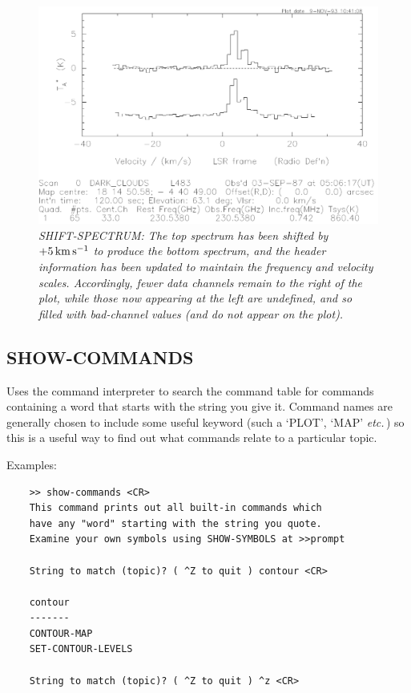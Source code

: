 \documentclass[11pt,twoside]{report}
\newcommand{\etc}{{\it etc.\,}}
\newcommand{\kms}{{\rm\,km\,s^{-1}}}
\begin{document}
\begin{figure}[htbp]
\begin{center}
\includegraphics[scale=0.65]{shift}
\protect\parbox{5.5in}
{\caption[SHIFT]
{\sl
SHIFT-SPECTRUM: The top spectrum has been shifted by $+5\kms$ to produce
the bottom spectrum, and the header information has been updated to maintain
the frequency and velocity scales. Accordingly, fewer data channels remain to
the right of the plot, while those now appearing at the left are undefined, and
so filled with bad-channel values (and do not appear on the plot).
\label{SHIFT}
}
}
\end{center}
\end{figure}

\subsection{SHOW-COMMANDS} 

Uses the command interpreter to search the command table 
for commands containing a word that starts with the string you give it. Command
names are generally chosen to include some useful keyword  (such
a `PLOT', `MAP' \etc) so this is a useful way to find out what commands relate
to a particular topic.

Examples:
\begin{verbatim}
    >> show-commands <CR>
    This command prints out all built-in commands which
    have any "word" starting with the string you quote.
    Examine your own symbols using SHOW-SYMBOLS at >>prompt

    String to match (topic)? ( ^Z to quit ) contour <CR>

    contour
    -------
    CONTOUR-MAP
    SET-CONTOUR-LEVELS

    String to match (topic)? ( ^Z to quit ) ^z <CR>
\end{verbatim}
\end{document}
